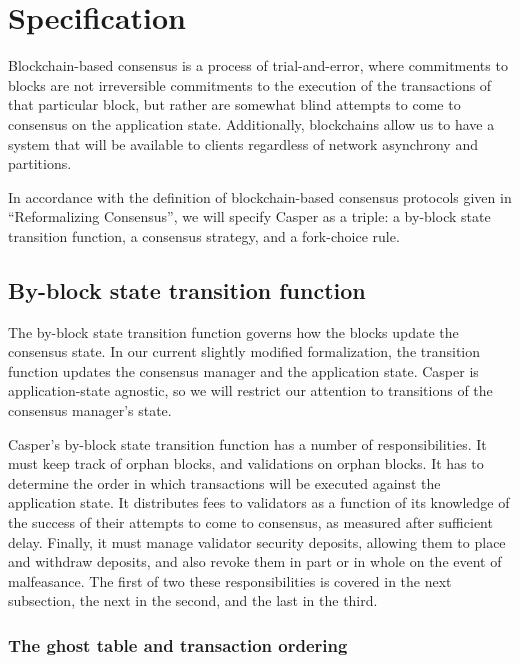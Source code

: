 \documentclass[11pt,a4paper]{article}
\begin{document}
\section{Specification}

Blockchain-based consensus is a process of trial-and-error, where commitments to blocks are not irreversible commitments to the execution of the transactions of that particular block, but rather are somewhat blind attempts to come to consensus on the application state. Additionally, blockchains allow us to have a system that will be available to clients regardless of network asynchrony and partitions.

In accordance with the definition of blockchain-based consensus protocols given in ``Reformalizing Consensus''\cite{ReformalizingConsensus}, we will specify Casper as a triple: a by-block state transition function, a consensus strategy, and a fork-choice rule.


\subsection{By-block state transition function}

The by-block state transition function governs how the blocks update the consensus state. In our current slightly modified formalization, the transition function updates the consensus manager and the application state. Casper is application-state agnostic, so we will restrict our attention to transitions of the consensus manager's state. 

Casper's by-block state transition function has a number of responsibilities. It must keep track of orphan blocks, and validations on orphan blocks. It has to determine the order in which transactions will be executed against the application state. It distributes fees to validators as a function of its knowledge of the success of their attempts to come to consensus, as measured after sufficient delay. Finally, it must manage validator security deposits, allowing them to place and withdraw deposits, and also revoke them in part or in whole on the event of malfeasance. The first of two these responsibilities is covered in the next subsection, the next in the second, and the last in the third.


\subsubsection{The ghost table and transaction ordering}
\end{document}
